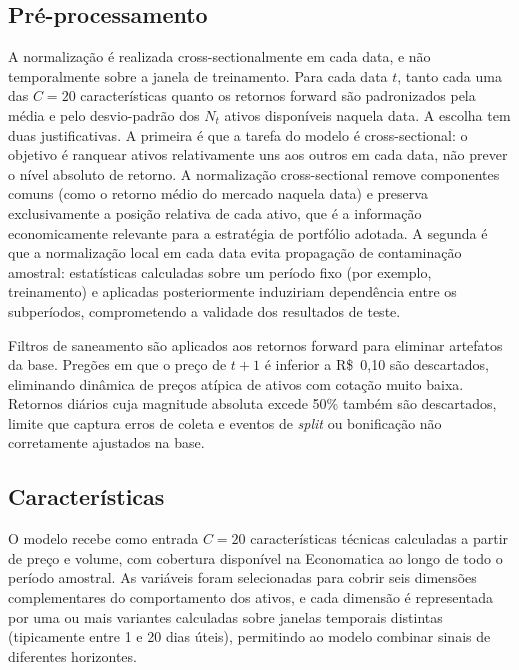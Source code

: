 \subsection{Pré-processamento}
\label{subsec:preprocessing}

A normalização é realizada cross-sectionalmente em cada data, e não temporalmente
sobre a janela de treinamento. Para cada data $t$, tanto cada uma das $C = 20$
características quanto os retornos forward são padronizados pela média e pelo
desvio-padrão dos $N_t$ ativos disponíveis naquela data. A escolha tem duas
justificativas. A primeira é que a tarefa do modelo é cross-sectional: o objetivo é
ranquear ativos relativamente uns aos outros em cada data, não prever o nível absoluto
de retorno. A normalização cross-sectional remove componentes comuns (como o retorno
médio do mercado naquela data) e preserva exclusivamente a posição relativa de cada
ativo, que é a informação economicamente relevante para a estratégia de portfólio
adotada. A segunda é que a normalização local em cada data evita propagação de
contaminação amostral: estatísticas calculadas sobre um período fixo (por exemplo,
treinamento) e aplicadas posteriormente induziriam dependência entre os subperíodos,
comprometendo a validade dos resultados de teste.

Filtros de saneamento são aplicados aos retornos forward para eliminar artefatos da
base. Pregões em que o preço de $t{+}1$ é inferior a R\$~0{,}10 são descartados,
eliminando dinâmica de preços atípica de ativos com cotação muito baixa. Retornos
diários cuja magnitude absoluta excede 50\% também são descartados, limite que captura
erros de coleta e eventos de \textit{split} ou bonificação não corretamente ajustados
na base.


\subsection{Características}
\label{subsec:caracteristicas}

O modelo recebe como entrada $C = 20$ características técnicas calculadas a partir de
preço e volume, com cobertura disponível na Economatica ao longo de todo o período
amostral. As variáveis foram selecionadas para cobrir seis dimensões complementares do
comportamento dos ativos, e cada dimensão é representada por uma ou mais variantes
calculadas sobre janelas temporais distintas (tipicamente entre 1 e 20 dias úteis),
permitindo ao modelo combinar sinais de diferentes horizontes.

